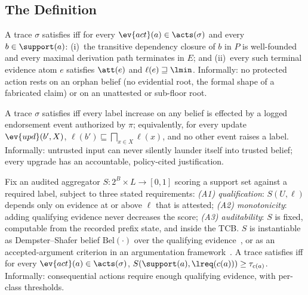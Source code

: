 \subsection{The Definition}
\begin{definition}
\label{def:i1}
A trace $\sigma$ satisfies \Ione{} iff for every
$\ev{act}(a) \in \acts(\sigma)$ and every $b \in \support(a)$:
(i)~the transitive dependency closure of $b$ in $P$ is
well-founded and every maximal derivation path terminates in $E$;
and (ii)~every such terminal evidence atom $e$ satisfies $\att(e)$
and $\ell(e) \sqsupseteq \lmin$. Informally: no protected action
rests on an orphan belief (no evidential root, the formal shape
of a fabricated claim) or on an unattested or sub-floor root.
\end{definition}

\begin{definition}
\label{def:i2}
A trace $\sigma$ satisfies \Itwo{} iff every label increase on any
belief is effected by a logged endorsement event authorized by
$\pi$; equivalently, for every update $\ev{upd}(b', X)$,
$\ell(b') \sqsubseteq \bigsqcap_{x \in X} \ell(x)$, and no other
event raises a label. Informally: untrusted input can never
silently launder itself into trusted belief; every upgrade has an
accountable, policy-cited justification.
\end{definition}

\begin{definition}
\label{def:i3}
Fix an audited aggregator $S : 2^{B} \times L \to [0,1]$ scoring a
support set against a required label, subject to three stated
requirements: \emph{(A1) qualification}: $S(U, \ell)$ depends only
on evidence at or above $\ell$ that is attested;
\emph{(A2) monotonicity}: adding qualifying evidence never
decreases the score; \emph{(A3) auditability}: $S$ is fixed,
computable from the recorded prefix state, and inside the TCB.
$S$ is instantiable as Dempster--Shafer belief $\mathrm{Bel}(\cdot)$
over the qualifying evidence~\cite{shafer}, or as an
accepted-argument criterion in an argumentation
framework~\cite{dung}. A trace satisfies \Ithree{} iff for every
$\ev{act}(a) \in \acts(\sigma)$,
$S(\support(a), \lreq(c(a))) \geq \tau_{c(a)}$. Informally:
consequential actions require enough qualifying evidence, with
per-class thresholds.
\end{definition}

